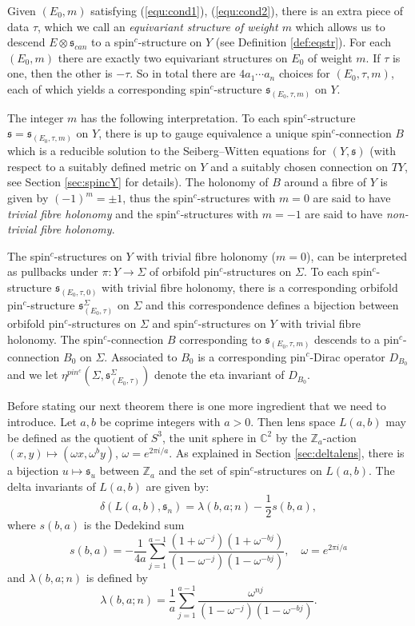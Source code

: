 \documentclass{amsart}
\theoremstyle{definition}
\theoremstyle{remark}
\numberwithin{equation}{section}
\begin{document}
Given $(E_0 , m)$ satisfying (\ref{equ:cond1}), (\ref{equ:cond2}), there is an extra piece of data $\tau$, which we call an {\em equivariant structure of weight $m$} which allows us to descend $E \otimes \mathfrak{s}_{can}$ to a spin$^c$-structure on $Y$ (see Definition \ref{def:eqstr}). For each $(E_0 , m)$ there are exactly two equivariant structures on $E_0$ of weight $m$. If $\tau$ is one, then the other is $-\tau$. So in total there are $4a_1 \cdots a_n$ choices for $(E_0 , \tau , m)$, each of which yields a corresponding spin$^c$-structure $\mathfrak{s}_{(E_0 , \tau , m)}$ on $Y$.

The integer $m$ has the following interpretation. To each spin$^c$-structure $\mathfrak{s} = \mathfrak{s}_{(E_0 , \tau , m)}$ on $Y$, there is up to gauge equivalence a unique spin$^c$-connection $B$ which is a reducible solution to the Seiberg--Witten equations for $(Y , \mathfrak{s})$ (with respect to a suitably defined metric on $Y$ and a suitably chosen connection on $TY$, see Section \ref{sec:spincY} for details). The holonomy of $B$ around a fibre of $Y$ is given by $(-1)^m = \pm 1$, thus the spin$^c$-structures with $m=0$ are said to have {\em trivial fibre holonomy} and the spin$^c$-structures with $m=-1$ are said to have {\em non-trivial fibre holonomy}.

The spin$^c$-structures on $Y$ with trivial fibre holonomy ($m=0$), can be interpreted as pullbacks under $\pi : Y \to \Sigma$ of orbifold pin$^c$-structures on $\Sigma$. To each spin$^c$-structure $\mathfrak{s}_{(E_0 , \tau , 0)}$ with trivial fibre holonomy, there is a corresponding orbifold pin$^c$-structure $\mathfrak{s}^\Sigma_{(E_0 , \tau)}$ on $\Sigma$ and this correspondence defines a bijection between orbifold pin$^c$-structures on $\Sigma$ and spin$^c$-structures on $Y$ with trivial fibre holonomy. The spin$^c$-connection $B$ corresponding to $\mathfrak{s}_{(E_0 , \tau , m)}$ descends to a pin$^c$-connection $B_0$ on $\Sigma$. Associated to $B_0$ is a corresponding pin$^c$-Dirac operator $D_{B_0}$ and we let $\eta^{pin^c}(\Sigma , \mathfrak{s}^\Sigma_{(E_0 , \tau)})$ denote the eta invariant of $D_{B_0}$.

Before stating our next theorem there is one more ingredient that we need to introduce. Let $a,b$ be coprime integers with $a > 0$. Then lens space $L(a,b)$ may be defined as the quotient of $S^3$, the unit sphere in $\mathbb{C}^2$ by the $\mathbb{Z}_a$-action $(x , y) \mapsto ( \omega x  ,\omega^b y)$, $\omega = e^{2\pi i /a}$. As explained in Section \ref{sec:deltalens}, there is a bijection $u \mapsto \mathfrak{s}_u$ between $\mathbb{Z}_a$ and the set of spin$^c$-structures on $L(a,b)$. The delta invariants of $L(a,b)$ are given by:
\[
\delta( L(a,b) , \mathfrak{s}_n ) = \lambda(b,a;n) - \frac{1}{2}s(b,a),
\]
where $s(b,a)$ is the Dedekind sum
\[
s(b,a) = -\frac{1}{4a} \sum_{j=1}^{a-1} \frac{ (1+\omega^{-j})(1+\omega^{-bj})}{(1-\omega^{-j})(1-\omega^{-bj}) }, \quad \omega = e^{2\pi i /a}
\]
and $\lambda(b,a;n)$ is defined by
\[
\lambda(b,a;n) = \frac{1}{a} \sum_{j=1}^{a-1} \frac{ \omega^{nj}}{(1-\omega^{-j})(1-\omega^{-bj}) }.
\]
\end{document}
